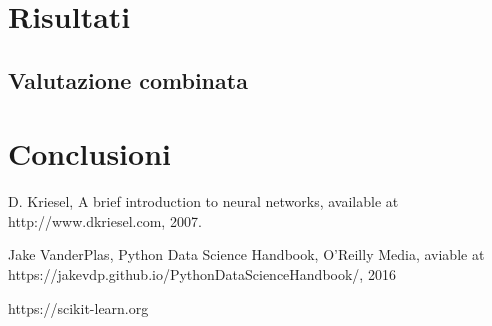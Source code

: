 \documentclass[a4paper,12pt]{report}
\begin{document}
% 
% 
\chapter{Risultati}
\label{cap3}
\section{Valutazione combinata}

% 
% 
\chapter{Conclusioni}
\label{cap4}

%
%
\begin{thebibliography}{00}
%
%
D. Kriesel, A brief introduction to neural networks, available at
http://www.dkriesel.com, 2007. %
%

Jake VanderPlas, Python Data Science Handbook, O'Reilly Media, aviable at
https://jakevdp.github.io/PythonDataScienceHandbook/, 2016

https://scikit-learn.org


\end{thebibliography}
% 
\end{document}
